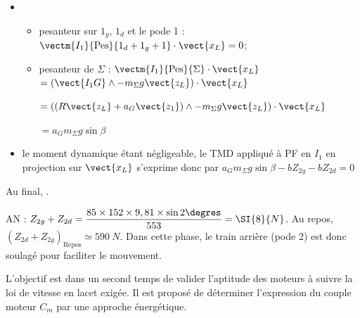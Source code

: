 \begin{corrige}
\begin{itemize}
\item $\quad$
\begin{itemize}
\item pesanteur sur $1_g$, $1_d$ et le pode 1 :  $\vectm{I_1}{\text{Pes}}{1_d+1_g+1}\cdot \vect{x_L}=0$;
\item pesanteur de $\Sigma$ : $\vectm{I_1}{\text{Pes}}{\Sigma}\cdot \vect{x_L}$
$ = \left(\vect{I_1 G} \wedge - m_\Sigma g \vect{z_L}\right) \cdot \vect{x_L}$

$ = \left(\left(R \vect{z_L}+ a_G \vect{z_1}\right) \wedge - m_\Sigma g \vect{z_L}\right) \cdot \vect{x_L}$


$ = a_G  m_\Sigma g \sin \beta$

\end{itemize}
\item le moment dynamique étant négligeable, le TMD appliqué à PF en $I_1$ en projection sur $\vect{x_L}$ s'exprime donc par 
$ a_G  m_\Sigma g \sin \beta -b Z_{2g}-bZ_{2d} =0 $
\end{itemize}

Au final, .

AN : $Z_{2g}+ Z_{2d}= \dfrac{ 85\times 152 \times  9,81 \times  \sin 2\degres  }{553}=\SI{8}{N} $.
Au repos, $\left(Z_{2d}+Z_{2g}\right)_{\text{Repos}} \simeq \SI{590}{N}$. Dans cette phase, le train arrière (pode 2) est donc soulagé pour faciliter le mouvement. 

\end{corrige}

\else
\fi

\ifprof
\else
L’objectif est dans un second temps de valider l’aptitude des moteurs à suivre la loi de vitesse en lacet exigée. Il est
proposé de déterminer l’expression du couple moteur $C_m$ par une approche énergétique.
\fi


